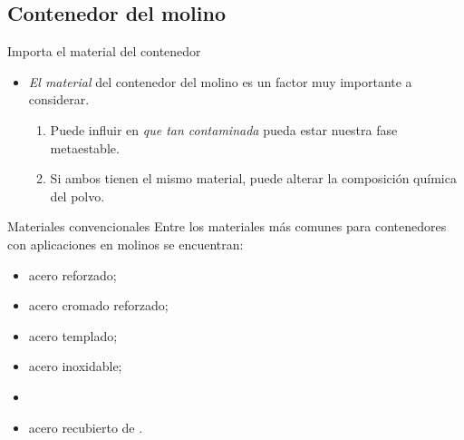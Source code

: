 \documentclass[%
spanish,
progressbar=head,
subsectionpage,
aspectratio=169
]{beamer}
\begin{document}
\subsection{Contenedor del molino}

\begin{frame}{Importa el material del contenedor}
\begin{itemize}
    \item \emph{El material} del contenedor del molino es un factor muy importante a considerar.
    \begin{enumerate}
        \item<2-> Puede influir en \emph{que tan contaminada} pueda estar nuestra fase metaestable.
        \item<3-> Si ambos tienen el mismo material, puede alterar la composición química del polvo.
    \end{enumerate}
\end{itemize}
\end{frame}

\begin{frame}{Materiales convencionales}
    Entre los materiales más comunes para contenedores con aplicaciones en molinos se encuentran:
    \begin{itemize}[<+-| alert@+>]
        \item acero reforzado;
        \item acero cromado reforzado;
        \item acero templado;
        \item acero inoxidable;
        \item {}
        \item acero recubierto de .
    \end{itemize}
\end{frame}
\end{document}
